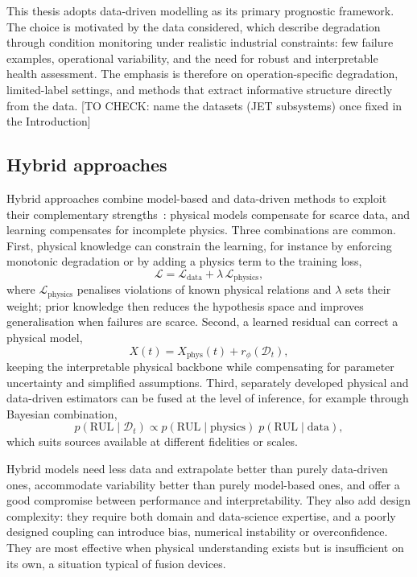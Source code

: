 \documentclass{book}
\newcommand{\tocheck}[1]{{\color{red}\small[TO CHECK: #1]}}
\begin{document}
This thesis adopts data-driven modelling as its primary prognostic framework.
The choice is motivated by the data considered, which describe degradation
through condition monitoring under realistic industrial constraints: few
failure examples, operational variability, and the need for robust and
interpretable health assessment. The emphasis is therefore on
operation-specific degradation, limited-label settings, and methods that
extract informative structure directly from the data.
\tocheck{name the datasets (JET subsystems) once fixed in the Introduction}

\subsection{Hybrid approaches}

Hybrid approaches combine model-based and data-driven methods to exploit their
complementary strengths~\cite{Lei2018,Si2011RUL}: physical models compensate for
scarce data, and learning compensates for incomplete physics. Three
combinations are common. First, physical knowledge can constrain the learning,
for instance by enforcing monotonic degradation or by adding a physics term
to the training loss,
\begin{equation}
  \mathcal{L} = \mathcal{L}_{\mathrm{data}} + \lambda\,\mathcal{L}_{\mathrm{physics}},
  \label{eq:pinn}
\end{equation}
where $\mathcal{L}_{\mathrm{physics}}$ penalises violations of known physical
relations and $\lambda$ sets their weight; prior knowledge then reduces the
hypothesis space and improves generalisation when failures are scarce.
Second, a learned residual can correct a physical model,
\begin{equation}
  X(t) = X_{\mathrm{phys}}(t) + r_\phi(\mathcal{D}_t),
  \label{eq:residual}
\end{equation}
keeping the interpretable physical backbone while compensating for parameter
uncertainty and simplified assumptions. Third, separately developed physical
and data-driven estimators can be fused at the level of inference, for
example through Bayesian combination,
\begin{equation}
  p(\mathrm{RUL} \mid \mathcal{D}_t) \propto
  p(\mathrm{RUL} \mid \mathrm{physics})\; p(\mathrm{RUL} \mid \mathrm{data}),
  \label{eq:fusion_bayes}
\end{equation}
which suits sources available at different fidelities or scales.

Hybrid models need less data and extrapolate better than purely data-driven
ones, accommodate variability better than purely model-based ones, and offer
a good compromise between performance and interpretability. They also add
design complexity: they require both domain and data-science expertise, and a
poorly designed coupling can introduce bias, numerical instability or
overconfidence. They are most effective when physical understanding exists
but is insufficient on its own, a situation typical of fusion devices.
\end{document}
